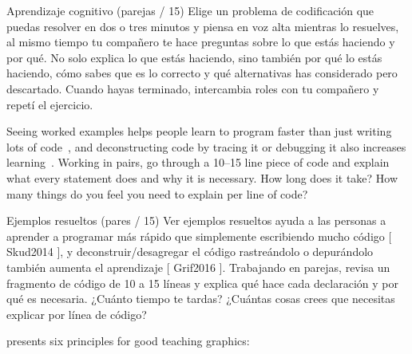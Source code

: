 Aprendizaje cognitivo (parejas / 15)
Elige un problema de codificación que puedas resolver en dos o tres minutos y piensa en voz alta mientras lo resuelves, al mismo tiempo tu compañero te hace preguntas sobre lo que estás haciendo y por qué. No solo explica lo que estás haciendo, sino también por qué lo estás haciendo, cómo sabes que es lo correcto y qué alternativas has considerado pero descartado. Cuando hayas terminado, intercambia roles con tu compañero y repetí el ejercicio.



Seeing worked examples helps people learn to program faster than just writing lots of code~\cite{Skud2014},
and deconstructing code by tracing it or debugging it also increases learning~\cite{Grif2016}.
Working in pairs,
go through a 10--15 line piece of code and explain what every statement does
and why it is necessary.
How long does it take?
How many things do you feel you need to explain per line of code?

Ejemplos resueltos (pares / 15)
Ver ejemplos resueltos ayuda a las personas a aprender a programar más rápido que simplemente escribiendo mucho código [ Skud2014 ], y deconstruir/desagregar el código rastreándolo o depurándolo también aumenta el aprendizaje [ Grif2016 ]. Trabajando en parejas, revisa un fragmento de código de 10 a 15 líneas y explica qué hace cada declaración y por qué es necesaria. ¿Cuánto tiempo te tardas? ¿Cuántas cosas crees que necesitas explicar por línea de código?


\cite{Maye2009,Mill2016a} presents six principles for good teaching graphics:

